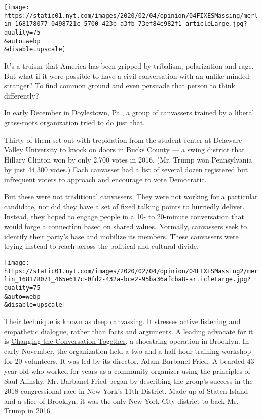 \texttt{[image: https://static01.nyt.com/images/2020/02/04/opinion/04FIXESMassing/merlin\_168178077\_0498721c-5700-423b-a3fb-73ef84e982f1-articleLarge.jpg?quality=75\\\&auto=webp\\\&disable=upscale]}

It's a truism that America has been gripped by tribalism, polarization
and rage. But what if it were possible to have a civil conversation with
an unlike-minded stranger? To find common ground and even persuade that
person to think differently?

In early December in Doylestown, Pa., a group of canvassers trained by a
liberal grass-roots organization tried to do just that.

Thirty of them set out with trepidation from the student center at
Delaware Valley University to knock on doors in Bucks County --- a swing
district that Hillary Clinton won by only 2,700 votes in 2016. (Mr.
Trump won Pennsylvania by just 44,300 votes.) Each canvasser had a list
of several dozen registered but infrequent voters to approach and
encourage to vote Democratic.

But these were not traditional canvassers. They were not working for a
particular candidate, nor did they have a set of fixed talking points to
hurriedly deliver. Instead, they hoped to engage people in a 10- to
20-minute conversation that would forge a connection based on shared
values. Normally, canvassers seek to identify their party's base and
mobilize its members. These canvassers were trying instead to reach
across the political and cultural divide.

\texttt{[image: https://static01.nyt.com/images/2020/02/04/opinion/04FIXESMassing2/merlin\_168178071\_465e617c-0fd2-432a-bce2-95ba36afcba8-articleLarge.jpg?quality=75\\\&auto=webp\\\&disable=upscale]}

Their technique is known as deep canvassing. It stresses active
listening and empathetic dialogue, rather than facts and arguments. A
leading advocate for it is \href{https://www.ctctogether.org/}{Changing
the Conversation Together}, a shoestring operation in Brooklyn. In early
November, the organization held a two-and-a-half-hour training workshop
for 20 volunteers. It was led by its director, Adam Barbanel-Fried. A
bearded 43-year-old who worked for years as a community organizer using
the principles of Saul Alinsky, Mr. Barbanel-Fried began by describing
the group's success in the 2018 congressional race in New York's 11th
District. Made up of Staten Island and a slice of Brooklyn, it was the
only New York City district to back Mr. Trump in 2016.

